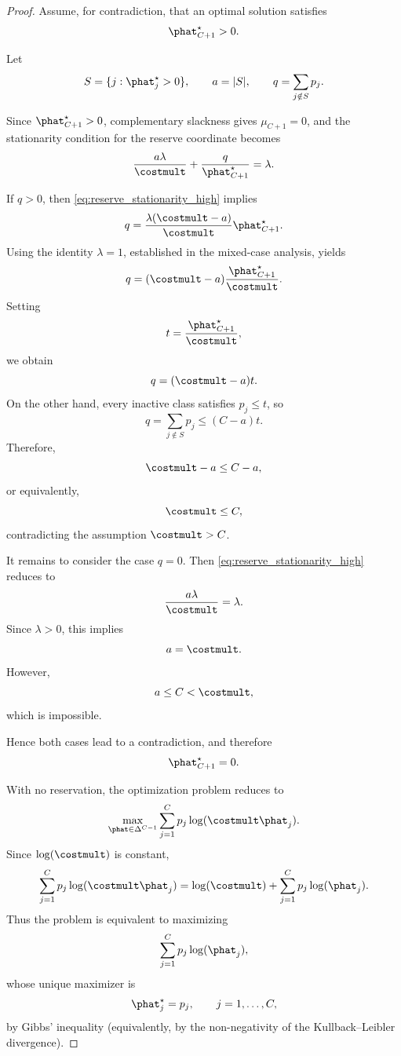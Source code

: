\begin{proof}
    Assume, for contradiction, that an optimal solution satisfies
    \[
        \phat_{C+1}^\star>0.
    \]

    Let
    \[
        S=\{j:\phat_j^\star>0\},
        \qquad
        a=|S|,
        \qquad
        q=\sum_{j\notin S}p_j.
    \]

    Since \(\phat_{C+1}^\star>0\), complementary slackness gives
    \(\mu_{C+1}=0\), and the stationarity condition for the reserve
    coordinate becomes
    \begin{equation}
        \frac{a\lambda}{\costmult}
        +
        \frac{q}{\phat_{C+1}^\star}
        =
        \lambda.
        \label{eq:reserve_stationarity_high}
    \end{equation}

    If \(q>0\), then \eqref{eq:reserve_stationarity_high} implies
    \[
        q
        =
        \frac{\lambda(\costmult-a)}
        {\costmult}
        \phat_{C+1}^\star.
    \]
    Using the identity \(\lambda=1\), established in the mixed-case
    analysis, yields
    \[
        q
        =
        (\costmult-a)
        \frac{\phat_{C+1}^\star}{\costmult}.
    \]
    Setting
    \[
        t=\frac{\phat_{C+1}^\star}{\costmult},
    \]
    we obtain
    \[
        q=(\costmult-a)t.
    \]
    On the other hand, every inactive class satisfies
    \(p_j\le t\), so
    \[
        q
        =
        \sum_{j\notin S}p_j
        \le
        (C-a)t.
    \]
    Therefore,
    \[
        \costmult-a
        \le
        C-a,
    \]
    or equivalently,
    \[
        \costmult\le C,
    \]
    contradicting the assumption \(\costmult>C\).

    It remains to consider the case \(q=0\). Then
    \eqref{eq:reserve_stationarity_high} reduces to
    \[
        \frac{a\lambda}{\costmult}
        =
        \lambda.
    \]
    Since \(\lambda>0\), this implies
    \[
        a=\costmult.
    \]
    However,
    \[
        a\le C<\costmult,
    \]
    which is impossible.

    Hence both cases lead to a contradiction, and therefore
    \[
        \phat_{C+1}^\star=0.
    \]

    With no reservation, the optimization problem reduces to
    \[
        \max_{\phat\in\Delta^{C-1}}
        \sum_{j=1}^{C}
        p_j\log(\costmult\phat_j).
    \]
    Since \(\log(\costmult)\) is constant,
    \[
        \sum_{j=1}^{C}
        p_j\log(\costmult\phat_j)
        =
        \log(\costmult)
        +
        \sum_{j=1}^{C}
        p_j\log(\phat_j).
    \]
    Thus the problem is equivalent to maximizing
    \[
        \sum_{j=1}^{C}
        p_j\log(\phat_j),
    \]
    whose unique maximizer is
    \[
        \phat_j^\star=p_j,
        \qquad
        j=1,\ldots,C,
    \]
    by Gibbs' inequality (equivalently, by the non-negativity of the
    Kullback--Leibler divergence).
\end{proof}


